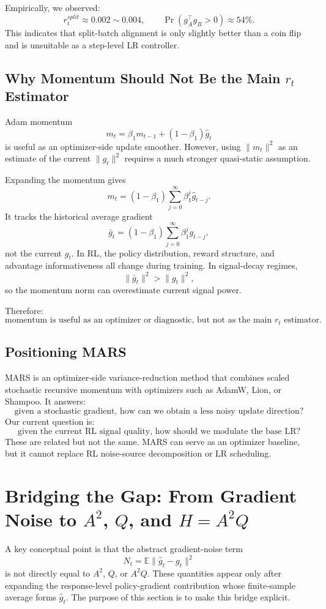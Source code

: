 \documentclass[11pt,a4paper]{article}
\begin{document}
Empirically, we observed:
\[
r_t^{split}\approx 0.002\sim 0.004,\qquad
\Pr(g_A^\top g_B>0)\approx 54\%.
\]
This indicates that split-batch alignment is only slightly better than a coin flip and is unsuitable as a step-level LR controller.

\subsection{Why Momentum Should Not Be the Main \(r_t\) Estimator}

Adam momentum
\[
m_t=\beta_1 m_{t-1}+(1-\beta_1)\hat g_t
\]
is useful as an optimizer-side update smoother. However, using \(\|m_t\|^2\) as an estimate of the current \(\|g_t\|^2\) requires a much stronger quasi-static assumption.

Expanding the momentum gives
\[
m_t=(1-\beta_1)\sum_{j=0}^\infty \beta_1^j \hat g_{t-j}.
\]
It tracks the historical average gradient
\[
\bar g_t=(1-\beta_1)\sum_{j=0}^\infty \beta_1^j g_{t-j},
\]
not the current \(g_t\). In RL, the policy distribution, reward structure, and advantage informativeness all change during training. In signal-decay regimes,
\[
\|\bar g_t\|^2>\|g_t\|^2,
\]
so the momentum norm can overestimate current signal power.

Therefore:
\[
\boxed{
\text{momentum is useful as an optimizer or diagnostic, but not as the main } r_t \text{ estimator.}
}
\]

\subsection{Positioning MARS}

MARS is an optimizer-side variance-reduction method that combines scaled stochastic recursive momentum with optimizers such as AdamW, Lion, or Shampoo. It answers:
\[
\boxed{
\text{given a stochastic gradient, how can we obtain a less noisy update direction?}
}
\]
Our current question is:
\[
\boxed{
\text{given the current RL signal quality, how should we modulate the base LR?}
}
\]
These are related but not the same. MARS can serve as an optimizer baseline, but it cannot replace RL noise-source decomposition or LR scheduling.


\section{Bridging the Gap: From Gradient Noise to \(A^2\), \(Q\), and \(H=A^2Q\)}

A key conceptual point is that the abstract gradient-noise term
\[
N_t=\mathbb{E}\|\hat g_t-g_t\|^2
\]
is not directly equal to \(A^2\), \(Q\), or \(A^2Q\). These quantities appear only after expanding the response-level policy-gradient contribution whose finite-sample average forms \(\hat g_t\). The purpose of this section is to make this bridge explicit.
\end{document}
